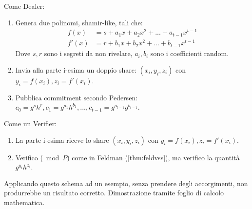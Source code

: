 \begin{definition}\label{def:pedvss}
Come Dealer:
\begin{enumerate}
    \item Genera due polinomi, shamir-like, tali che:
    \begin{equation*}
        \begin{aligned}
            f(x)&=s+a_1x+a_2x^2+...+a_{t-1}x^{t-1}\\
            f'(x)&=r+b_1x+b_2x^2+...+b_{t-1}x^{t-1}
        \end{aligned}
    \end{equation*}
    Dove $s,r$ sono i segreti da non rivelare, $a_i,b_i$ sono i coefficienti random.
    \item Invia alla parte i-esima un doppio share: $(x_i,y_i,z_i)$ con $y_i=f(x_i),z_i=f'(x_i)$.
    \item Pubblica commitment secondo Pedersen: $c_0=g^sh^r,c_1=g^{a_1}h^{b_1},...,c_{t-1}=g^{a_{t-1}}g^{b_{t-1}}$.
\end{enumerate}
Come un Verifier:
\begin{enumerate}
    \item La parte i-esima riceve lo share $(x_i,y_i,z_i)$ con $y_i=f(x_i),z_i=f'(x_i)$.
    \item Verifico ($\bmod P$) come in Feldman (\cref{thm:feldvss}), ma verifico la quantità $g^{y_i}h^{z_i}$.
\end{enumerate}
\end{definition}
\begin{note}
Applicando questo schema ad un esempio, senza prendere degli accorgimenti, non produrrebbe un risultato corretto. Dimostrazione tramite foglio di calcolo mathematica.
\end{note}
